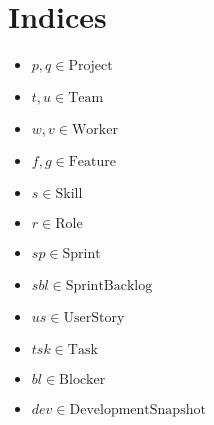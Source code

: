 \documentclass[11pt]{article}
\begin{document}
\section{Indices}
\begin{itemize}
    \item $p, q \in \text{Project}$
    \item $t, u \in \text{Team}$
    \item $w, v \in \text{Worker}$
    \item $f, g \in \text{Feature}$
    \item $s \in \text{Skill}$
    \item $r \in \text{Role}$
    \item $sp \in \text{Sprint}$
    \item $sbl \in \text{SprintBacklog}$
    \item $us \in \text{UserStory}$
    \item $tsk \in \text{Task}$
    \item $bl \in \text{Blocker}$
    \item $dev \in \text{DevelopmentSnapshot}$
\end{itemize}
\end{document}
